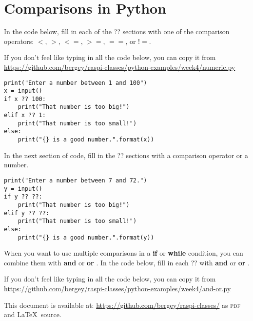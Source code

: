 \documentclass{article}
\newcommand\And{\textbf{and} }
\newcommand\Or{\textbf{or} }
\begin{document}
\section{Comparisons in Python}

In the code below, fill in each of the ?? sections with one of the comparison operators:   $<$, $>$, $<=$, $>=$, $==$, or $!=$.

If you don't feel like typing in all the code below, you can copy it from \url{https://github.com/bergey/raspi-classes/python-examples/week4/numeric.py}

\begin{lstlisting}
print("Enter a number between 1 and 100")
x = input()
if x ?? 100:
    print("That number is too big!")
elif x ?? 1:
    print("That number is too small!")
else:
    print("{} is a good number.".format(x))  
\end{lstlisting}

In the next section of code, fill in the ?? sections with a comparison operator or a number.

\begin{lstlisting}
print("Enter a number between 7 and 72.")
y = input()
if y ?? ??:
    print("That number is too big!")
elif y ?? ??:
    print("That number is too small!")
else:
    print("{} is a good number.".format(y))
\end{lstlisting}

When you want to use multiple comparisons in a \textbf{if} or \textbf{while} condition, you can combine them with \And or \Or.  In the code below, fill in each ?? with \And or \Or.

If you don't feel like typing in all the code below, you can copy it from \url{https://github.com/bergey/raspi-classes/python-examples/week4/and-or.py}



This document is available at: \url{https://github.com/bergey/raspi-classes/} as \textsc{pdf} and \LaTeX\ source.  
\end{document}

